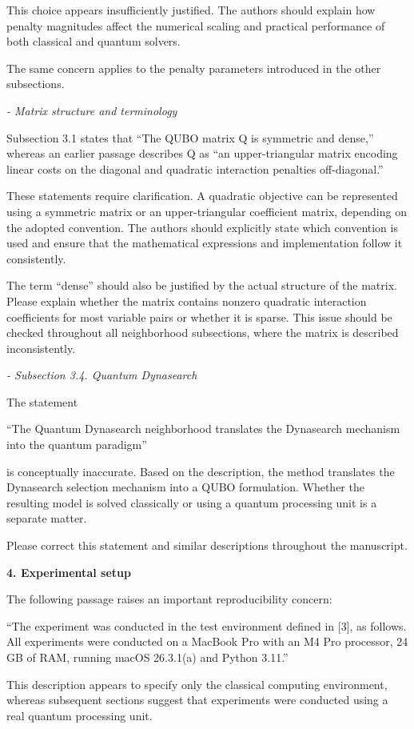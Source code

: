 \documentclass[12pt]{article}
\begin{document}
This choice appears insufficiently justified. The authors should explain how penalty magnitudes affect the numerical scaling and practical performance of both classical and quantum solvers.

The same concern applies to the penalty parameters introduced in the other subsections.

\emph{- Matrix structure and terminology}

Subsection 3.1 states that ``The QUBO matrix Q is symmetric and dense,'' whereas an earlier passage describes Q as ``an upper-triangular matrix encoding linear costs on the diagonal and quadratic interaction penalties off-diagonal.''

These statements require clarification. A quadratic objective can be represented using a symmetric matrix or an upper-triangular coefficient matrix, depending on the adopted convention. The authors should explicitly state which convention is used and ensure that the mathematical expressions and implementation follow it consistently.

The term ``dense'' should also be justified by the actual structure of the matrix. Please explain whether the matrix contains nonzero quadratic interaction coefficients for most variable pairs or whether it is sparse. This issue should be checked throughout all neighborhood subsections, where the matrix is described inconsistently.

\emph{- Subsection 3.4. Quantum Dynasearch}

The statement

``The Quantum Dynasearch neighborhood translates the Dynasearch mechanism into the quantum paradigm''

is conceptually inaccurate. Based on the description, the method translates the Dynasearch selection mechanism into a QUBO formulation. Whether the resulting model is solved classically or using a quantum processing unit is a separate matter.

Please correct this statement and similar descriptions throughout the manuscript.

\textbf{4. Experimental setup}

The following passage raises an important reproducibility concern:

``The experiment was conducted in the test environment defined in [3], as follows. All experiments were conducted on a MacBook Pro with an M4 Pro processor, 24 GB of RAM, running macOS 26.3.1(a) and Python 3.11.''

This description appears to specify only the classical computing environment, whereas subsequent sections suggest that experiments were conducted using a real quantum processing unit.
\end{document}
